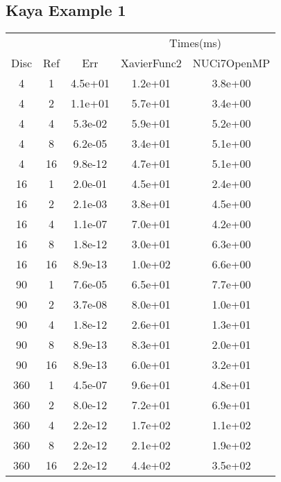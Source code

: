 \subsection{Kaya Example 1}
\begin{center}
\begin{tabular}{c|c|c|c|c}
	&&&\multicolumn{2}{|c}{Times(ms)}\\
	Disc&Ref&Err&XavierFunc2&NUCi7OpenMP\\
\hline
4&1&4.5e+01&1.2e+01&3.8e+00\\
4&2&1.1e+01&5.7e+01&3.4e+00\\
4&4&5.3e-02&5.9e+01&5.2e+00\\
4&8&6.2e-05&3.4e+01&5.1e+00\\
4&16&9.8e-12&4.7e+01&5.1e+00\\
\hline
16&1&2.0e-01&4.5e+01&2.4e+00\\
16&2&2.1e-03&3.8e+01&4.5e+00\\
16&4&1.1e-07&7.0e+01&4.2e+00\\
16&8&1.8e-12&3.0e+01&6.3e+00\\
16&16&8.9e-13&1.0e+02&6.6e+00\\
\hline
90&1&7.6e-05&6.5e+01&7.7e+00\\
90&2&3.7e-08&8.0e+01&1.0e+01\\
90&4&1.8e-12&2.6e+01&1.3e+01\\
90&8&8.9e-13&8.3e+01&2.0e+01\\
90&16&8.9e-13&6.0e+01&3.2e+01\\
\hline
360&1&4.5e-07&9.6e+01&4.8e+01\\
360&2&8.0e-12&7.2e+01&6.9e+01\\
360&4&2.2e-12&1.7e+02&1.1e+02\\
360&8&2.2e-12&2.1e+02&1.9e+02\\
360&16&2.2e-12&4.4e+02&3.5e+02\\
\hline
\end{tabular}
\end{center}







